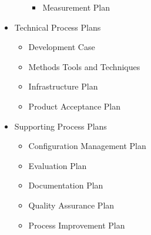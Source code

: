 \begin{itemize}
\begin{itemize}
\begin{itemize}
			\item Measurement Plan
		\end{itemize}
	\end{itemize}
	\item Technical Process Plans
	\begin{itemize}
		\item Development Case
		\item Methods Tools and Techniques
		\item Infrastructure Plan
		\item Product Acceptance Plan
	\end{itemize}
	\item Supporting Process Plans
	\begin{itemize}
		\item Configuration Management Plan
		\item Evaluation Plan
		\item Documentation Plan
		\item Quality Assurance Plan
		\item Process Improvement Plan
	\end{itemize}
\end{itemize}
